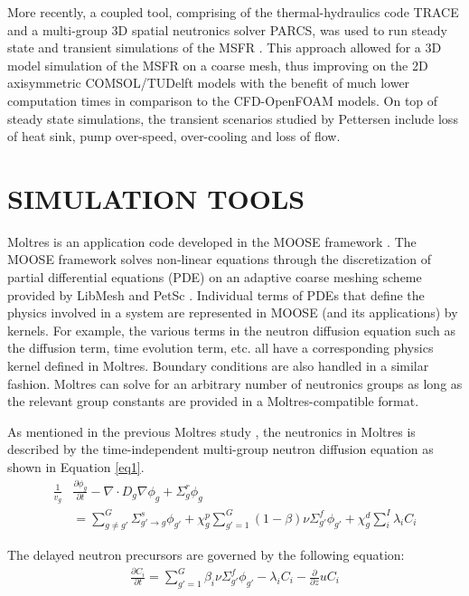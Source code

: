 \documentclass{anstrans}
\begin{document}
More recently, a coupled tool, comprising of the thermal-hydraulics code TRACE and a multi-group 3D spatial neutronics solver PARCS, was used to run steady state and transient simulations of the MSFR \cite{pettersen_coupled_2016}. This approach allowed for a 3D model simulation of the MSFR on a coarse mesh, thus improving on the 2D axisymmetric COMSOL/TUDelft models with the benefit of much lower computation times in comparison to the CFD-OpenFOAM models. On top of steady state simulations, the transient scenarios studied by Pettersen \cite{pettersen_coupled_2016} include loss of heat sink, pump over-speed, over-cooling and loss of flow. 

\section{SIMULATION TOOLS}

Moltres is an application code developed in the MOOSE framework \cite{gaston_moose:_2009}. The MOOSE framework solves non-linear equations through the discretization of partial differential equations (PDE) on an adaptive coarse meshing scheme provided by LibMesh \cite{kirk_libmesh:_2006} and PetSc \cite{satish_balay_petsc_2015}. Individual terms of PDEs that define the physics involved in a system are represented in MOOSE (and its applications) by kernels. For example, the various terms in the neutron diffusion equation such as the diffusion term, time evolution term, etc. all have a corresponding physics kernel defined in Moltres. Boundary conditions are also handled in a similar fashion. Moltres can solve for an arbitrary number of neutronics groups as long as the relevant group constants are provided in a Moltres-compatible format.

As mentioned in the previous Moltres study \cite{lindsay_introduction_2018}, the neutronics in Moltres is described by the time-independent multi-group neutron diffusion equation as shown in Equation \ref{eq1}.
\begin{align}
\frac{1}{v_g} &\frac{\partial \phi_g}{\partial t} - \nabla \cdot D_g \nabla \phi_g + \Sigma^r_g \phi_g \nonumber \\ 
&= \sum^G_{g \neq g'} \Sigma^s_{g' \rightarrow g} \phi_{g'} + \chi^p_g \sum^G_{g'=1} (1-\beta) \nu \Sigma^f_{g'} \phi_{g'} + \chi^d_g \sum^I_i \lambda_i C_i \label{eq1}
\end{align}

The delayed neutron precursors are governed by the following equation:
\begin{align}
\frac{\partial C_i}{\partial t} = \sum^G_{g'=1} \beta_i \nu \Sigma^f_{g'} \phi_{g'} - \lambda_i C_i - \frac{\partial}{\partial z} u C_i \label{eq2}
\end{align}
\end{document}
